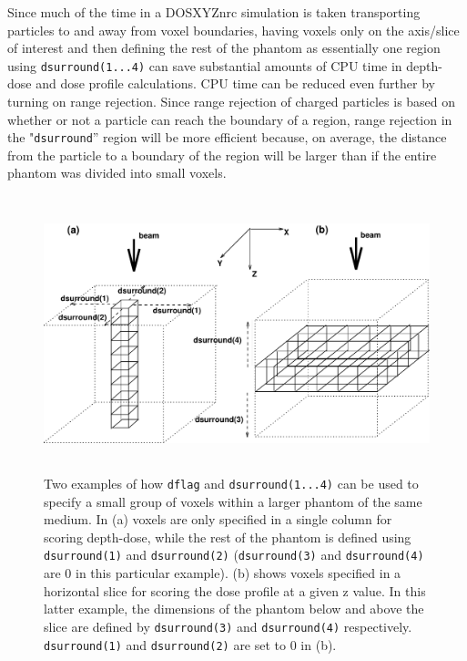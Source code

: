 \documentclass[12pt,twoside]{article}      %
\begin{document}
Since much of the time in a DOSXYZnrc simulation is taken transporting
particles
to and away from voxel boundaries, having voxels only on the axis/slice
of interest and then defining the rest of the phantom as essentially one region
using {\tt dsurround(1...4)} can save substantial amounts of CPU time in
depth-dose and dose profile calculations.  CPU time can be reduced
even further by turning on range rejection.  Since range rejection of
charged particles is based on whether or not a particle can reach the
boundary of a region, range rejection in the "{\tt dsurround}''
region will be more efficient because, on average, the distance from the
particle to a boundary of the region will be larger than if the entire
phantom was divided into small voxels.
\vspace*{-0.5cm}
\begin{figure}[H]
\begin{center}
\includegraphics[height=8cm]{figures/dsurround_fig1}
\caption{Two examples of how {\tt dflag} and {\tt dsurround(1...4)} can be used
to
specify a small group of voxels within a larger phantom of the same medium.
In (a) voxels are only specified in a single column for scoring depth-dose,
while the rest of the phantom is defined using {\tt dsurround(1)} and
{\tt dsurround(2)} ({\tt dsurround(3)} and {\tt dsurround(4)} are 0 in this
particular example).  (b) shows voxels specified in a horizontal slice
for scoring the dose profile at a given z value.
In this latter example, the dimensions of the phantom below and above the
slice are defined by {\tt dsurround(3)} and {\tt dsurround(4)} respectively.
{\tt dsurround(1)} and {\tt dsurround(2)} are set to 0 in (b).}
\label{fig_dsurround}
\end{center}
\end{figure}
\end{document}
